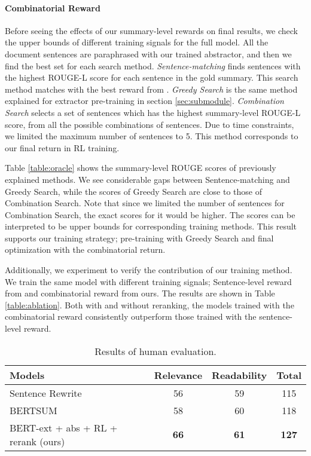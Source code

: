\documentclass[11pt,a4paper]{article}
\begin{document}
\paragraph{Combinatorial Reward}
Before seeing the effects of our summary-level rewards on final results,
we check the upper bounds of different training signals for the full model.
All the document sentences are paraphrased with our trained abstractor,
and then we find the best set for each search method.
\emph{Sentence-matching} finds sentences with the highest ROUGE-L score for
each sentence in the gold summary. This search method matches with the
best reward from \citet{chen-bansal-2018-fast}.
\emph{Greedy Search} is the same method explained for
extractor pre-training in section \ref{sec:submodule}.
\emph{Combination Search} selects a set of sentences
which has the highest summary-level ROUGE-L score,
from all the possible combinations of sentences.
Due to time constraints, we limited the maximum number
of sentences to 5. This method corresponds to our final return
in RL training.

Table \ref{table:oracle} shows the
summary-level ROUGE scores of previously explained methods.
We see considerable gaps between Sentence-matching and Greedy Search,
while the scores of Greedy Search are close to those of Combination Search.
Note that since we limited the number of sentences for Combination Search,
the exact scores for it would be higher.
The scores can be interpreted to be upper bounds for corresponding training methods.
This result supports our training strategy; pre-training with
Greedy Search and final optimization with the combinatorial return.

Additionally, we experiment to verify the contribution of our training method.
We train the same model with different training signals;
Sentence-level reward from \citet{chen-bansal-2018-fast} and combinatorial 
reward from ours. The results are shown in Table \ref{table:ablation}.
Both with and without reranking, the models trained with the combinatorial reward
consistently outperform those trained with the sentence-level reward.

\begin{table}
\begin{center}
\begin{adjustbox}{max width=\columnwidth}
\begin{tabular}{l|cc|c}
    \hline 
    \bf Models & \bf Relevance & \bf Readability & \bf Total \\ 
    \hline
    Sentence Rewrite \cite{chen-bansal-2018-fast} & 56 & 59 & 115 \\
    BERTSUM \cite{liu2019fine} & 58 & 60 & 118 \\
    BERT-ext + abs + RL + rerank (ours) & \bf 66 & \bf 61 & \bf 127 \\
    \hline
\end{tabular}
\end{adjustbox}
\end{center}
\caption{\label{table:human} Results of human evaluation.}
\end{table}
\end{document}
